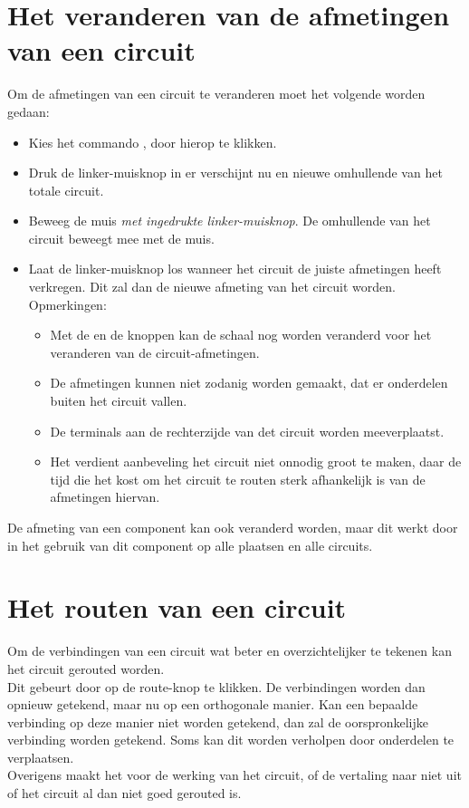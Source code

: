 \section{Het veranderen van de afmetingen van een circuit}
Om de afmetingen van een circuit te veranderen moet het volgende
worden gedaan:
\begin{itemize}
\item Kies het commando , door hierop te klikken.
\item Druk de linker-muisknop in er verschijnt nu en nieuwe omhullende van het
      totale circuit.
\item Beweeg de muis {\it met ingedrukte linker-muisknop}. De omhullende van
      het circuit beweegt mee met de muis.
\item Laat de linker-muisknop los wanneer het circuit de juiste afmetingen
      heeft verkregen. Dit zal dan de nieuwe afmeting van het circuit worden.\\
      Opmerkingen:
      \begin{itemize}
      \item Met de  en de  knoppen kan de schaal nog worden
            veranderd voor het veranderen van de circuit-afmetingen.
      \item De afmetingen kunnen niet zodanig worden gemaakt, dat er onderdelen
            buiten het circuit vallen.
      \item De terminals aan de rechterzijde van det circuit worden meeverplaatst.
      \item Het verdient aanbeveling het circuit niet onnodig groot te maken,
            daar de tijd die het kost om het circuit te routen sterk
            afhankelijk is van de afmetingen hiervan.
      \end{itemize}
\end{itemize}
De afmeting van een component kan ook veranderd worden,
maar dit werkt door in het gebruik van dit component op alle plaatsen en alle circuits.

\section{Het routen van een circuit}
Om de verbindingen van een circuit wat beter en overzichtelijker te tekenen
kan het circuit gerouted worden. \\
Dit gebeurt door op de route-knop  te klikken.
De verbindingen worden dan opnieuw gete\-kend, maar nu op een orthogonale manier.
Kan een bepaalde verbinding op deze manier niet worden getekend,
dan zal de oorspronkelijke verbinding worden getekend.
Soms kan dit worden verholpen door onderdelen te verplaatsen.\\
Overigens maakt het voor de werking van het circuit, of de vertaling naar
 niet uit of het circuit al dan niet goed gerouted is.

